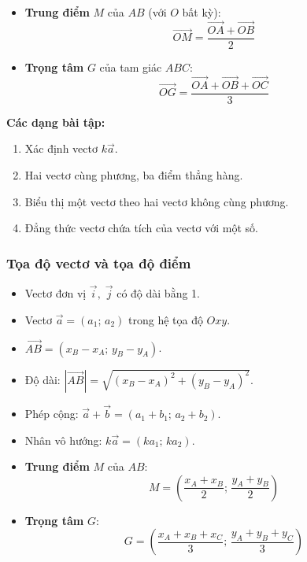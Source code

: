 \documentclass[12pt,a4paper]{article}
\begin{document}
\begin{congthuc}[title={Trung điểm và trọng tâm}]
  \begin{itemize}
    \item \textbf{Trung điểm} $M$ của $AB$ (với $O$ bất kỳ):
      \[
        \overrightarrow{OM} = \dfrac{\overrightarrow{OA} + \overrightarrow{OB}}{2}
      \]
    \item \textbf{Trọng tâm} $G$ của tam giác $ABC$:
      \[
        \overrightarrow{OG} = \dfrac{\overrightarrow{OA} + \overrightarrow{OB} + \overrightarrow{OC}}{3}
      \]
  \end{itemize}
\end{congthuc}

\medskip\noindent\textbf{Các dạng bài tập:}
\begin{enumerate}[label=\textbf{Dạng \arabic*:}, leftmargin=*, align=left]
  \item Xác định vectơ $k\vec a$.
  \item Hai vectơ cùng phương, ba điểm thẳng hàng.
  \item Biểu thị một vectơ theo hai vectơ không cùng phương.
  \item Đẳng thức vectơ chứa tích của vectơ với một số.
\end{enumerate}

\subsubsection{Tọa độ vectơ và tọa độ điểm}

\begin{congthuc}[title={Tọa độ vectơ và tọa độ điểm}]
  \begin{itemize}
    \item Vectơ đơn vị $\vec i,\; \vec j$ có độ dài bằng 1.
    \item Vectơ $\vec a = (a_1;\, a_2)$ trong hệ tọa độ $Oxy$.
    \item $\overrightarrow{AB} = (x_B - x_A;\, y_B - y_A)$.
    \item Độ dài: $|\overrightarrow{AB}| = \sqrt{(x_B - x_A)^2 + (y_B - y_A)^2}$.
    \item Phép cộng: $\vec a + \vec b = (a_1 + b_1;\, a_2 + b_2)$.
    \item Nhân vô hướng: $k\vec a = (ka_1;\, ka_2)$.
    \item \textbf{Trung điểm} $M$ của $AB$:
      \[
        M = \left(\dfrac{x_A + x_B}{2};\, \dfrac{y_A + y_B}{2}\right)
      \]
    \item \textbf{Trọng tâm} $G$:
      \[
        G = \left(\dfrac{x_A + x_B + x_C}{3};\, \dfrac{y_A + y_B + y_C}{3}\right)
      \]
  \end{itemize}
\end{congthuc}
\end{document}
